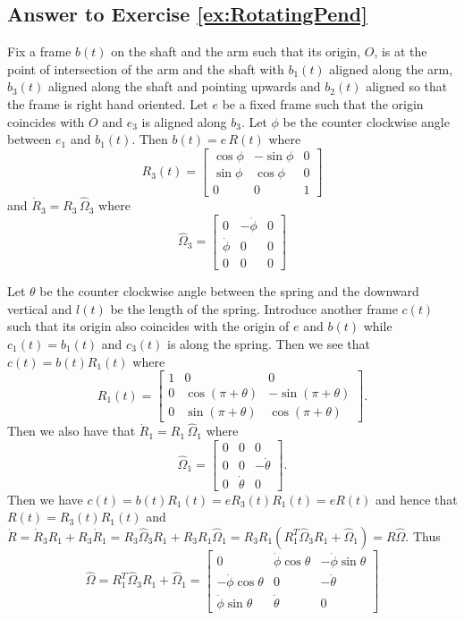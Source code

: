 \documentclass[graybox,envcountchap,sectrefs]{svmonoMuga}
\begin{document}
\subsection*{Answer to Exercise \ref{ex:RotatingPend}}
Fix a frame $b(t)$ on the shaft and the arm such that its origin, $O$, is at the point of intersection of the arm and the shaft with $b_1(t)$ aligned along the arm, $b_3(t)$ aligned along 
the shaft and pointing upwards and $b_2(t)$ aligned so that the frame is right hand oriented. Let $e$ be a fixed frame such that the origin coincides with $O$ and $e_3$ is aligned 
along $b_3$. Let $\phi$ be the counter clockwise angle between $e_1$ and $b_1(t)$.
Then $b(t)=e\,R(t)$ where
\[
R_3(t)=\left[
\begin{array}{ccc}
\cos{\phi} & -\sin{\phi} & 0 \\
\sin{\phi} & \cos{\phi} & 0\\
0 & 0 & 1
\end{array}
\right]
\]
and $\dot{R}_3=R_3\,\widehat{\Omega}_3$
where
\[
\widehat{\Omega}_3=\left[
\begin{array}{ccc}
0 & -\dot{\phi} & 0 \\
\dot{\phi} & 0 & 0\\
0 & 0 & 0
\end{array}
\right]
\]


Let  $\theta$ be the  counter clockwise angle between the spring and the downward vertical and $l(t)$ be the 
length of the spring. Introduce another frame $c(t)$ such that its origin also coincides with the origin of $e$ and $b(t)$ while $c_1(t)=b_1(t)$ and $c_3(t)$ is along the spring. Then we see that $c(t)=b(t)R_1(t)$ where
\[
R_1(t)=\left[
\begin{array}{ccc}
1 & 0 & 0\\
0 & \cos{(\pi+\theta)} & -\sin{(\pi+\theta)} \\
0 & \sin{(\pi+\theta)} & \cos{(\pi+\theta)} 
\end{array}
\right].
\]
Then we also have that
$\dot{R}_1=R_1\,\widehat{\Omega}_1$
where
\[
\widehat{\Omega}_1=\left[
\begin{array}{ccc}
0 & 0 & 0 \\
0 & 0 & -\dot{\theta}\\
0 & \dot{\theta} & 0
\end{array}
\right].
\]
Then we have $c(t)=b(t)R_1(t)=eR_3(t)R_1(t)=eR(t)$ and hence that $R(t)=R_3(t)R_1(t)$ and 
$\dot{R}=\dot{R}_3R_1+R_3\dot{R}_1=R_3\widehat{\Omega}_3R_1+R_3R_1\widehat{\Omega}_1=R_3R_1(R_1^T\widehat{\Omega}_3R_1+\widehat{\Omega}_1)=R\widehat{\Omega}$. Thus
\[
\widehat{\Omega}=R_1^T\widehat{\Omega}_3R_1+\widehat{\Omega}_1=\begin{bmatrix}0 & \dot{\phi}\cos{\theta} & -\dot{\phi}\sin{\theta}\\
-\dot{\phi}\cos{\theta} & 0 & -\dot{\theta}\\
\dot{\phi}\sin{\theta} & \dot{\theta} & 0\end{bmatrix}
\]
\end{document}
